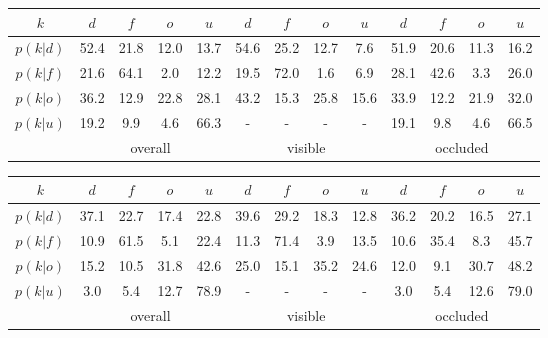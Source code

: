 \begin{center}
	\begin{tabular}{c|cccc|cccc|cccc}
		$k$ & $d$ & $f$ & $o$ & $u$ & $d$ & $f$ & $o$ & $u$ & $d$ & $f$ & $o$ & $u$\\
		\hline
		$p(k|d)$ & \textcolor{mygreen}{52.4} & 21.8 & 12.0 & 13.7 & \textcolor{mygreen}{54.6} & 25.2 & 12.7 & 7.6 & \textcolor{mygreen}{51.9} & 20.6 & 11.3 & 16.2\\
		$p(k|f)$ & 21.6 & \textcolor{mygreen}{64.1} & 2.0 & 12.2 & 19.5 & \textcolor{mygreen}{72.0} & 1.6 & 6.9 & 28.1 & \textcolor{mygreen}{42.6} & 3.3 & 26.0\\
		$p(k|o)$ & 36.2 & 12.9 & \textcolor{mygreen}{22.8} & 28.1 & 43.2 & 15.3 & \textcolor{mygreen}{25.8} & 15.6 & 33.9 & 12.2 & \textcolor{mygreen}{21.9} & 32.0\\
		$p(k|u)$ & 19.2 & 9.9 & 4.6 & \textcolor{mygreen}{66.3} & - & - & - & - & 19.1 & 9.8 & 4.6 & \textcolor{mygreen}{66.5} \\
		\hline
		& \multicolumn{4}{c|}{overall} & \multicolumn{4}{c|}{visible} & \multicolumn{4}{c}{occluded}
	\end{tabular}
\end{center}
\begin{center}
	\begin{tabular}{c|cccc|cccc|cccc}
		$k$ & $d$ & $f$ & $o$ & $u$ & $d$ & $f$ & $o$ & $u$ & $d$ & $f$ & $o$ & $u$\\
		\hline
		$p(k|d)$ & \textcolor{mygreen}{37.1} & 22.7 & 17.4 & 22.8 & \textcolor{mygreen}{39.6} & 29.2 & 18.3 & 12.8 & \textcolor{mygreen}{36.2} & 20.2 & 16.5 & 27.1\\
		$p(k|f)$ & 10.9 & \textcolor{mygreen}{61.5} & 5.1 & 22.4 & 11.3 & \textcolor{mygreen}{71.4} & 3.9 & 13.5 & 10.6 & \textcolor{mygreen}{35.4} & 8.3 & 45.7\\
		$p(k|o)$ & 15.2 & 10.5 & \textcolor{mygreen}{31.8} & 42.6 & 25.0 & 15.1 & \textcolor{mygreen}{35.2} & 24.6 & 12.0 & 9.1 & \textcolor{mygreen}{30.7} & 48.2\\
		$p(k|u)$ & 3.0 & 5.4 & 12.7 & \textcolor{mygreen}{78.9} & - & - & - & - & 3.0 & 5.4 & 12.6 & \textcolor{mygreen}{79.0} \\
		\hline
		& \multicolumn{4}{c|}{overall} & \multicolumn{4}{c|}{visible} & \multicolumn{4}{c}{occluded}
	\end{tabular}
\end{center}
